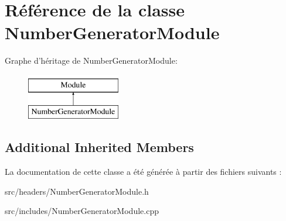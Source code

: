 \hypertarget{classNumberGeneratorModule}{\section{Référence de la classe Number\-Generator\-Module}
\label{classNumberGeneratorModule}
}
Graphe d'héritage de Number\-Generator\-Module\-:\begin{figure}[H]
\begin{center}
\leavevmode
\includegraphics[height=2.000000cm]{classNumberGeneratorModule}
\end{center}
\end{figure}
\subsection*{Additional Inherited Members}


La documentation de cette classe a été générée à partir des fichiers suivants \-:\begin{DoxyCompactItemize}
\item 
src/headers/Number\-Generator\-Module.\-h\item 
src/includes/Number\-Generator\-Module.\-cpp\end{DoxyCompactItemize}
